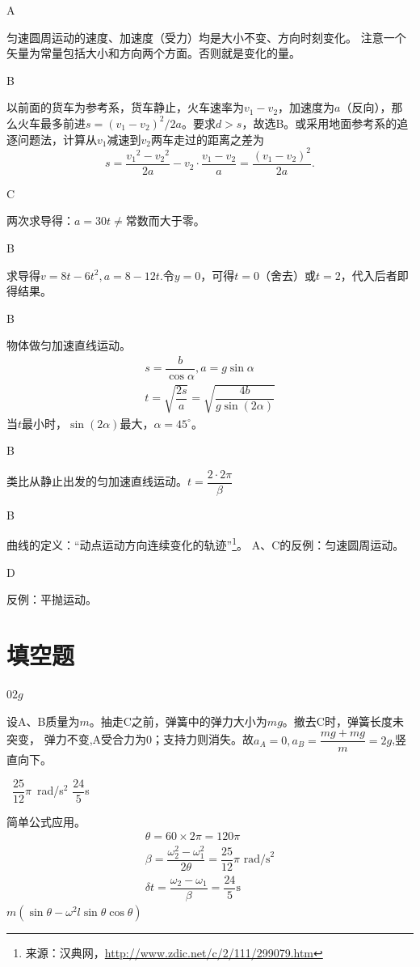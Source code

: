 \documentclass[b5paper,opensource,sourcefont,parskip]{qyxf-book}
\begin{document}
A

\solve 匀速圆周运动的速度、加速度（受力）均是大小不变、方向时刻变化。
注意一个矢量为常量包括大小和方向两个方面。否则就是变化的量。

B

\solve 以前面的货车为参考系，货车静止，火车速率为$v_1-v_2$，加速度为$a$（反向），那么火车最多前进$s={(v_1-v_2)}^2/{2a}$。要求$d>s$，故选B。或采用地面参考系的追逐问题法，计算从$v_1\text{减速到}v_2$两车走过的距离之差为
\[
s=\dfrac{{v_1}^2-{v_2}^2}{2a}-v_2\cdot \dfrac{v_1-v_2}{a}=\dfrac{{(v_1-v_2)}^2}{2a}.
\]

C

\solve 两次求导得：$a=30t\neq$常数而大于零。

B

\solve 求导得$v=8t-6t^2,a=8-12t$.令$y=0$，可得$t=0$（舍去）或$t=2$，代入后者即得结果。

B

\solve 物体做匀加速直线运动。
\begin{gather*}
s=\dfrac{b}{\cos\alpha},a=g\sin\alpha\\
t=\sqrt{\dfrac{2s}{a}}=\sqrt{\dfrac{4b}{g\sin(2\alpha)}}
\end{gather*}
当$t$最小时，$\sin(2\alpha)$最大，$\alpha=45^\circ$。

B

\solve 类比从静止出发的匀加速直线运动。$t=\dfrac{2\cdot 2\pi}{\beta}$

B

\solve 曲线的定义：“动点运动方向连续变化的轨迹”\footnote{来源：汉典网，\url{http://www.zdic.net/c/2/111/299079.htm}}。
A、C的反例：匀速圆周运动。

D

\solve 反例：平抛运动。

\section{填空题}
$0$\qquad$2g$

\solve 设A、B质量为$m$。抽走C之前，弹簧中的弹力大小为$mg$。撤去C时，弹簧长度未突变，
弹力不变,A受合力为0；支持力则消失。故$a_A=0,a_B=\dfrac{mg+mg}{m}=2g$,竖直向下。

\ $\dfrac{25}{12}\pi$\ rad/s${}^2$ \qquad$\dfrac{24}{5}$s

\solve 简单公式应用。
\begin{gather*}
\theta=60\times2\pi=120\pi\\
\beta=\dfrac{\omega_2^2-\omega_1^2}{2\theta}=\dfrac{25}{12}\pi\text{\ rad/s}^2\\
\delta t=\dfrac{\omega_2-\omega_1}{\beta}=\dfrac{24}{5}\mathrm{s}
\end{gather*}
$m(\sin\theta-\omega^2l\sin\theta\cos\theta)$
\end{document}
